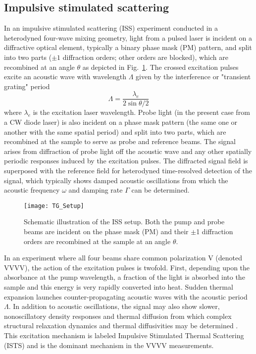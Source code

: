 \documentclass[reprint,showpacs,amsmath,amssymb,aip,jcp]{revtex4-1}
\begin{document}
\subsection{Impulsive stimulated scattering}\label{sec:ISTS}

In an impulsive stimulated scattering (ISS) experiment
conducted in a heterodyned four-wave mixing geometry, light from a
pulsed laser is incident on a diffractive optical element, typically a
binary phase mask (PM) pattern, and split into two parts ($\pm 1$
diffraction orders; other orders are blocked), which are recombined at
an angle $\theta$ as depicted in Fig.\ \ref{fig:expt}. The crossed
excitation pulses excite an acoustic wave with wavelength $\Lambda$
given by the interference or "transient grating" period
\begin{equation}
  \Lambda=\frac{\lambda_e}{2\sin{\theta/2}}
\end{equation}
where $\lambda_e$ is the excitation laser wavelength. Probe light (in
the present case from a CW diode laser) is also incident on a phase
mask pattern (the same one or another with the same spatial period)
and split into two parts, which are recombined at the sample to serve
as probe and reference beams. The signal arises from diffraction of
probe light off the acoustic wave and any other spatially periodic
responses induced by the excitation pulses. The diffracted signal
field is superposed with the reference field for heterodyned
time-resolved detection of the signal, which typically shows damped
acoustic oscillations from which the acoustic frequency $\omega$ and
damping rate $\Gamma$ can be determined.
\begin{figure}
  \texttt{[image: TG\_Setup]}
  \caption[Schematic illustration of the ISS setup]{\label{fig:expt}
    Schematic illustration of the ISS setup. Both the pump and probe
    beams are incident on the phase mask (PM) and their $\pm$1
    diffraction orders are recombined at the sample at an angle
    $\theta$.}
\end{figure}


In an experiment where all four beams share common polarization V
(denoted VVVV), the action of the excitation pulses is twofold. First,
depending upon the absorbance at the pump wavelength, a fraction of
the light is absorbed into the sample and this energy is very rapidly
converted into heat. Sudden thermal expansion launches
counter-propagating acoustic waves with the acoustic period
$\Lambda$. In addition to acoustic oscillations, the signal may also
show slower, nonoscillatory density responses and thermal diffusion
from which complex structural relaxation dynamics and thermal
diffusivities may be determined \cite{sYang1995}. This excitation
mechanism is labeled Impulsive Stimulated Thermal Scattering (ISTS)
and is the dominant mechanism in the VVVV measurements.
\end{document}
